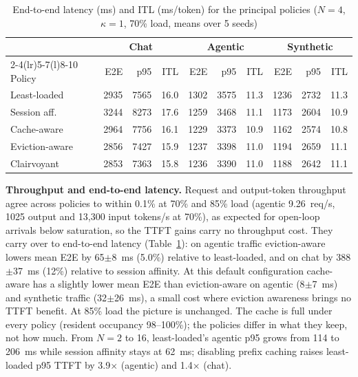 \documentclass[conference]{IEEEtran}
\begin{document}
\begin{table}[t]
\centering\scriptsize
\caption{End-to-end latency (ms) and ITL (ms/token) for the principal policies ($N=4$, $\kappa=1$, 70\% load, means over 5 seeds)}
\label{tab:thpt}
\setlength{\tabcolsep}{2.5pt}\renewcommand{\arraystretch}{0.9}
\begin{tabular}{@{}lrrrrrrrrr@{}}
\toprule
& \multicolumn{3}{c}{Chat} & \multicolumn{3}{c}{Agentic} & \multicolumn{3}{c}{Synthetic}\\
\cmidrule(lr){2-4}\cmidrule(lr){5-7}\cmidrule(l){8-10}
Policy & E2E & p95 & ITL & E2E & p95 & ITL & E2E & p95 & ITL\\
\midrule
Least-loaded & 2935 & 7565 & 16.0 & 1302 & 3575 & 11.3 & 1236 & 2732 & 11.3\\
Session aff. & 3244 & 8273 & 17.6 & 1259 & 3468 & 11.1 & 1173 & 2604 & 10.9\\
Cache-aware & 2964 & 7756 & 16.1 & 1229 & 3373 & 10.9 & 1162 & 2574 & 10.8\\
Eviction-aware & 2856 & 7427 & 15.9 & 1237 & 3398 & 11.0 & 1194 & 2659 & 11.1\\
Clairvoyant & 2853 & 7363 & 15.8 & 1236 & 3390 & 11.0 & 1188 & 2642 & 11.1\\
\bottomrule
\end{tabular}
\end{table}

\textbf{Throughput and end-to-end latency.} Request and output-token throughput agree across policies to within 0.1\% at 70\% and 85\% load (agentic 9.26~req/s, 1025 output and 13,300 input tokens/s at 70\%), as expected for open-loop arrivals below saturation, so the TTFT gains carry no throughput cost. They carry over to end-to-end latency (Table~\ref{tab:thpt}): on agentic traffic eviction-aware lowers mean E2E by 65$\pm$8~ms (5.0\%) relative to least-loaded, and on chat by 388$\pm$37~ms (12\%) relative to session affinity. At this default configuration cache-aware has a slightly lower mean E2E than eviction-aware on agentic (8$\pm$7~ms) and synthetic traffic (32$\pm$26~ms), a small cost where eviction awareness brings no TTFT benefit. At 85\% load the picture is unchanged. The cache is full under every policy (resident occupancy 98--100\%); the policies differ in what they keep, not how much. From $N=2$ to 16, least-loaded's agentic p95 grows from 114 to 206~ms while session affinity stays at 62~ms; disabling prefix caching raises least-loaded p95 TTFT by 3.9$\times$ (agentic) and 1.4$\times$ (chat).

\end{document}
